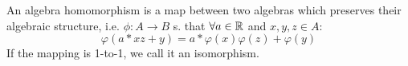 \begin{definition}[Homomorphisms]
    An algebra homomorphism is a map between two algebras which preserves their algebraic structure, i.e. $\phi: A \to B$ s. that $\forall a \in \mathbb{R}$ and $x, y, z \in A$:
    \[\varphi(a*xz+y) = a*\varphi(x)\varphi(z) + \varphi(y)\]
    If the mapping is 1-to-1, we call it an isomorphism.
\end{definition}
